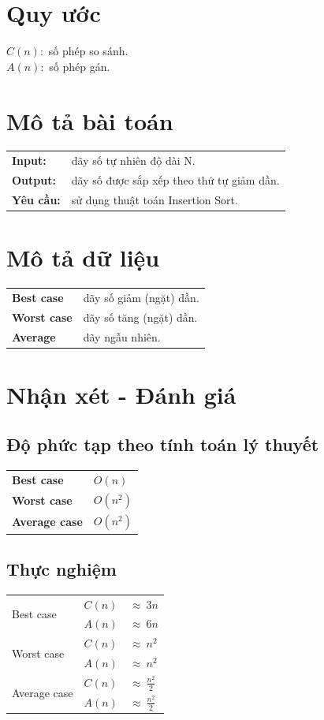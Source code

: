 \documentclass{article}
\begin{document}
\section{Quy ước}
$C(n):$ số phép so sánh.\\
$A(n):$ số phép gán.\\
\section{Mô tả bài toán}
\begin{tabular}{l l}
\textbf{Input:} &dãy số tự nhiên độ dài N.\\
\textbf{Output:} &dãy số được sắp xếp theo thứ tự giảm dần.\\
\textbf{Yêu cầu:} &sử dụng thuật toán Insertion Sort.\\
\end{tabular}
\section{Mô tả dữ liệu}
\begin{tabular}{l l}
	\textbf{Best case} &dãy số giảm (ngặt) dần.\\
	\textbf{Worst case} &dãy số tăng (ngặt) dần.\\
	\textbf{Average} &dãy ngẫu nhiên.\\
\end{tabular}
\section{Nhận xét - Đánh giá}
\subsection{Độ phức tạp theo tính toán lý thuyết}
\begin{tabular}{l l}
	\textbf{Best case} & $O(n)$\\
	\textbf{Worst case} & $O(n^2)$\\
	\textbf{Average case} & $O(n^2)$\\
\end{tabular}
\subsection{Thực nghiệm}
\begin{tabular}{l l l}
	\multirow{2}{*}{Best case} & $C(n)$ & $\approx~3n$ \\
	& $A(n)$ & $\approx~6n$\\
	\multirow{2}{*}{Worst case} & $C(n)$ &  $\approx~n^2$ \\
	& $A(n)$ &  $\approx~n^2$\\
	\multirow{2}{*}{Average case} & $C(n)$ & $\approx~\frac{n^2}{2}$ \\
	& $A(n)$ & $\approx~\frac{n^2}{2}$\\
\end{tabular}
\end{document}
